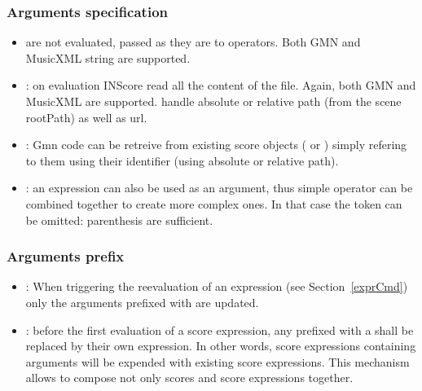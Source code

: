 \subsubsection{Arguments specification}

\begin{itemize}
\item {} are not evaluated, passed as they are to operators. Both GMN and MusicXML string are supported.
\item {}: on evaluation INScore read all the content of the file. Again, both GMN and MusicXML are supported.  handle absolute or relative path (from the scene rootPath) as well as url.
\item {}: Gmn code can be retreive from existing score objects ( or ) simply refering to them using their identifier (using absolute or relative path).
\item {}: an expression can also be used as an argument, thus simple operator can be combined together to create more complex ones. In that case the  token can be omitted: parenthesis are sufficient.
\end{itemize}

\subsubsection{Arguments prefix}

\begin{itemize}
\item \OSC{\&}: When triggering the reevaluation of an expression (see Section~\ref{exprCmd}) only the arguments prefixed with \OSC{\&} are updated.


\item \OSC{\lowTilde}: before the first evaluation of a score expression, any  prefixed with a \OSC{\lowTilde} shall be replaced by their own expression. In other words, score expressions containing \OSC{\lowTilde} arguments will be expended with existing score expressions. This mechanism allows to compose not only scores and score expressions together.

\end{itemize}

